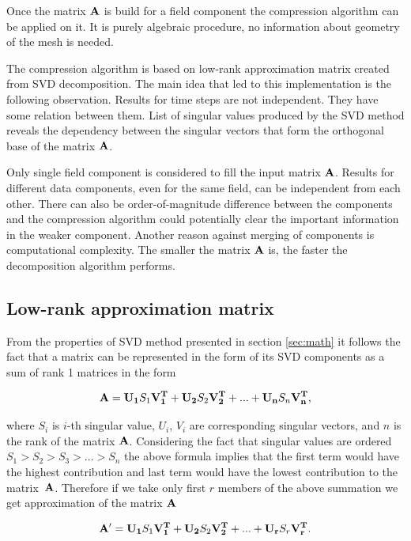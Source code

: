 Once the matrix $\mathbf{A}$ is build for a field component the compression algorithm can be applied on it. It is purely algebraic procedure, no information about geometry of the mesh is needed.

The compression algorithm is based on low-rank approximation matrix created from SVD decomposition. The main idea that led to this implementation is the following observation. Results for time steps are not independent. They have some relation between them. List of singular values produced by the SVD method reveals the dependency between the singular vectors that form the orthogonal base of the matrix $\mathbf{A}$. 

Only single field component is considered to fill the input matrix $\mathbf{A}$. Results for different data components, even for the same field, can be independent from each other. There can also be order-of-magnitude difference between the components and the compression algorithm could potentially clear the important information in the weaker component. Another reason against merging of components is computational complexity. The smaller the matrix $\mathbf{A}$ is, the faster the decomposition algorithm performs.

\subsection{Low-rank approximation matrix}

From the properties of SVD method presented in section \ref{sec:math} it follows the fact that a matrix can be represented in the form of its SVD components as a sum of rank 1 matrices in the form

\begin{equation}
\mathbf{A}=\mathbf{U_{1}}S_{1}\mathbf{V_{1}^{T}}+\mathbf{U_{2}}S_{2}\mathbf{V_{2}^{T}}+ ... +\mathbf{U_{n}}S_{n}\mathbf{V_{n}^{T}},
\label{eq:svd-expansion}
\end{equation}

where $S_{i}$ is $i$-th singular value, $U_{i}$, $V_{i}$ are corresponding singular vectors, and $n$ is the rank of the matrix $\mathbf{A}$. Considering the fact that singular values are ordered $S_{1}>S_{2}>S_{3}> ... >S_{n}$ the above formula implies that the first term would have the highest contribution and last term would have the lowest contribution to the matrix~$\mathbf{A}$. Therefore if we take only first $r$ members of the above summation we get approximation of the matrix $\mathbf{A}$

\begin{equation}
\mathbf{A'}=\mathbf{U_{1}}S_{1}\mathbf{V_{1}^{T}}+\mathbf{U_{2}}S_{2}\mathbf{V_{2}^{T}}+ ... +\mathbf{U_{r}}S_{r}\mathbf{V_{r}^{T}}.
\label{eq:svd-approx-expansion}
\end{equation}

